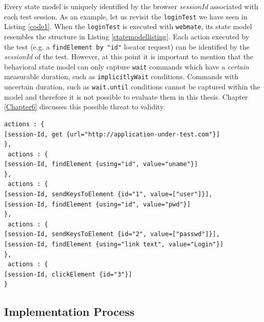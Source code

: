 Every state model is uniquely identified by the browser \textit{sessionId} associated with each test session. As an example, let us revisit the \texttt{loginTest} we have seen in Listing \ref{code1}. When the \texttt{loginTest} is executed with \texttt{webmate}, its state model resembles the structure in Listing \ref{statemodellisting}. Each action executed by the test (e.g. a \texttt{findElement by "id"} locator request) can be identified by the \textit{sessionId} of the test. However, at this point it is important to mention that the behavioral state model can only capture \texttt{wait} commands which have a \textit{certain} measurable duration, such as \texttt{implicitlyWait} conditions. Commands with uncertain duration, such as \texttt{wait.until} conditions cannot be captured within the model and therefore it is not possible to evaluate them in this thesis. Chapter \ref{Chapter6} discusses this possible threat to validity. 

\begin{center}
\begin{scriptsize}
\centering
\lstset{
  basicstyle=\ttfamily,
  columns=fullflexible,
  keepspaces=true,
}
  
\begin{lstlisting}[caption=Extracted behavioral state model for \texttt{loginTest},label=statemodellisting]
 actions : { 
[session-Id, get {url="http://application-under-test.com"}]
},
 actions : { 
[session-Id, findElement {using="id", value="uname"}]
},
 actions : { 
[session-Id, sendKeysToElement {id="1", value=["user"]}],
[session-Id, findElement {using="id", value="pwd"}]
},
 actions : { 
[session-Id, sendKeysToElement {id="2", value=["passwd"]}],
[session-Id, findElement {using="link text", value="Login"}]
},
 actions : { 
[session-Id, clickElement {id="3"}]
}
\end{lstlisting}
\end{scriptsize} 
\end{center}

\subsection{Implementation Process}
\label{toolimplementation}


